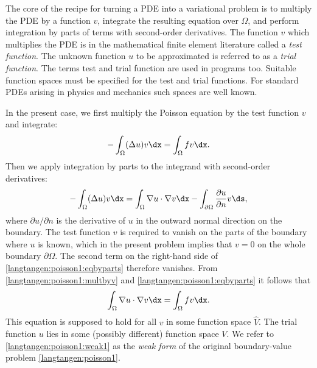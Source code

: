 

The core of the recipe for turning a PDE into a variational problem
is to multiply the PDE by a function $v$, integrate the resulting
equation over $\Omega$, and perform integration by parts of terms with
second-order derivatives. The function $v$ which multiplies the PDE
is in the mathematical finite element literature called a \emph{test
function}. The unknown function $u$ to be approximated is referred to
as a \emph{trial function}. The terms test and trial function are used
in \fenics{} programs too.  Suitable function spaces must be specified
for the test and trial functions.  For standard PDEs arising in physics
and mechanics such spaces are well known.

In the present case, we first multiply the Poisson equation by the test
function $v$ and integrate:
\begin{equation}
\label{langtangen:poisson1:multbyv}
 -\int_\Omega (\Delta u)v \dx = \int_\Omega fv\dx.\end{equation}
Then we apply integration by parts to the integrand with
second-order derivatives:
\begin{equation}
\label{langtangen:poisson1:eqbyparts}
 -\int_\Omega (\Delta u) v \dx
   = \int_\Omega \nabla u\cdot\nabla v\dx -
     \int_{\partial\Omega} \frac{\partial u}{\partial n} v\ds,
\end{equation}
where $\partial u / \partial n$ is the
derivative of $u$ in the outward normal direction on the boundary.
The test function $v$ is required to vanish on the parts of the
boundary where $u$ is known, which in the present problem implies that
$v=0$ on the whole boundary $\partial\Omega$.  The second term on the
right-hand side of \eqref{langtangen:poisson1:eqbyparts} therefore
vanishes.  From \eqref{langtangen:poisson1:multbyv} and
\eqref{langtangen:poisson1:eqbyparts} it follows that
\begin{equation}
  \int_\Omega\nabla u\cdot\nabla v\dx = \int_\Omega fv\dx.
\label{langtangen:poisson1:weak1}
\end{equation}
This equation is supposed to hold for all $v$ in some function space
$\hat V$. The trial function $u$ lies in some (possibly different)
function space $V$.  We refer to \eqref{langtangen:poisson1:weak1} as
the \emph{weak form} of the original boundary-value problem
\eqref{langtangen:poisson1}.

